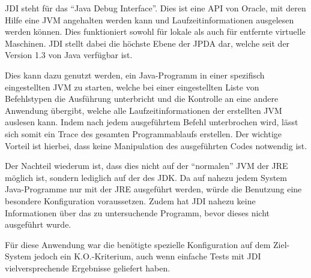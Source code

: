 \ac{JDI} steht für das "`Java Debug Interface"'. Dies ist eine \ac{API} von Oracle, mit deren Hilfe eine \ac{JVM} angehalten werden kann und Laufzeitinformationen ausgelesen werden können. Dies funktioniert sowohl für lokale als auch für entfernte virtuelle Maschinen. \ac{JDI} stellt dabei die höchste Ebene der \ac{JPDA} dar, welche seit der Version 1.3 von Java verfügbar ist.

Dies kann dazu genutzt werden, ein Java-Programm in einer spezifisch eingestellten \ac{JVM} zu starten, welche bei einer eingestellten Liste von Befehlstypen die Ausführung unterbricht und die Kontrolle an eine andere Anwendung übergibt, welche alle Laufzeitinformationen der erstellten \ac{JVM} auslesen kann. Indem nach jedem ausgeführtem Befehl unterbrochen wird, lässt sich somit ein Trace des gesamten Programmablaufs erstellen. Der wichtige Vorteil ist hierbei, dass keine Manipulation des ausgeführten Codes notwendig ist.

Der Nachteil wiederum ist, dass dies nicht auf der "`normalen"' \ac{JVM} der \ac{JRE} möglich ist, sondern lediglich auf der des \ac{JDK}. Da auf nahezu jedem System Java-Programme nur mit der \ac{JRE} ausgeführt werden, würde die Benutzung eine besondere Konfiguration voraussetzen. Zudem hat \ac{JDI} nahezu keine Informationen über das zu untersuchende Programm, bevor dieses nicht ausgeführt wurde.

Für diese Anwendung war die benötigte spezielle Konfiguration auf dem Ziel-System jedoch ein K.O.-Kriterium, auch wenn einfache Tests mit \ac{JDI} vielversprechende Ergebnisse geliefert haben.